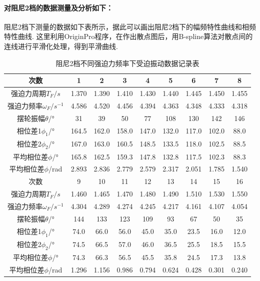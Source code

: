 \documentclass[UTF8]{ctexart}
\begin{document}
\paragraph{对阻尼2档的数据测量及分析如下：}\quad \par
阻尼2档下测量的数据如下表所示，据此可以画出阻尼2档下的幅频特性曲线和相频特性曲线. 这里利用OriginPro程序，在作出散点图后，用B-spline算法对散点间的连线进行平滑化处理，得到平滑曲线.\par
\begin{table}[H]{\begin{center}\caption{阻尼2档不同强迫力频率下受迫振动数据记录表}%
\begin{tabular}[H]{|c|c|c|c|c|c|c|c|c|}
\hline
次数&1&2&3&4&5&6&7&8\\
\hline
强迫力周期$T_F/s$&1.370&1.390&1.410&1.430&1.440&1.445&1.450&1.455\\
\hline
强迫力频率$\omega_F/s^{-1}$&4.586&4.520&4.456&4.394&4.363&4.348&4.333&4.318\\
\hline
摆轮振幅$\theta$/°&31&39&50&77&108&130&142&146\\
\hline
相位差1$\phi_1$/°&164.5&162.0&158.0&147.0&132.0&117.0&102.0&88.0\\
\hline
相位差2$\phi_2$/°&167.0&163.0&160.5&148.5&133.5&118.0&102.5&88.5\\
\hline
平均相位差$\phi$/°&165.8&162.5&159.3&147.8&132.8&117.5&102.3&88.3\\
\hline
平均相位差$\phi$/rad&2.893&2.836&2.779&2.579&2.317&2.051&1.785&1.540\\
\hline
次数&9&10&11&12&13&14&15&16\\
\hline
强迫力周期$T_F/s$&1.460&1.465&1.470&1.480&1.490&1.510&1.530&1.550\\
\hline
强迫力频率$\omega_F/s^{-1}$&4.304&4.289&4.274&4.245&4.217&4.161&4.107&4.054\\
\hline
摆轮振幅$\theta$/°&144&133&123&109&93&67&50&35\\
\hline
相位差1$\phi_1$/°&74.0&66.0&56.0&45.0&35.0&23.5&16.0&12.0\\
\hline
相位差2$\phi_2$/°&74.5&66.5&57.0&46.0&36.5&25.5&18.5&15.5\\
\hline
平均相位差$\phi$/°&74.3&66.3&56.5&45.5&35.8&24.5&17.3&13.8\\
\hline
平均相位差$\phi$/rad&1.296&1.156&0.986&0.794&0.624&0.428&0.301&0.240\\
\hline
\end{tabular}%
\end{center}}\end{table}
\end{document}

